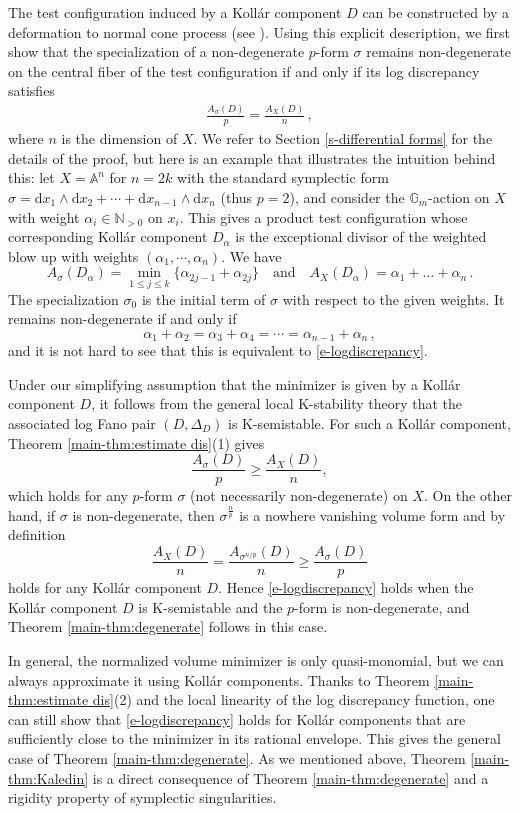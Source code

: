 \documentclass[12pt]{amsart}
\theoremstyle{definition}
\newcommand{\bN}{\mathbb{N}}
\newcommand{\bG}{\mathbb{G}}
\newcommand{\rd}{\mathrm{d}}
\numberwithin{equation}{section}
\begin{document}
The test configuration induced by a Koll\'ar component $D$ can be constructed by a deformation to normal cone process (see \cite{LX-Kol-comp-stab}). Using this explicit description, we first show that the specialization of a non-degenerate $p$-form $\sigma$ remains non-degenerate on the central fiber of the test configuration if and only if its log discrepancy satisfies 
\begin{eqnarray}\label{e-logdiscrepancy}
\frac{A_{\sigma}(D)}{p}=\frac{A_{X}(D)}{n} \, ,
\end{eqnarray}
where $n$ is the dimension of $X$. We refer to Section \ref{s-differential forms} for the details of the proof, but here is an example that illustrates the intuition behind this: let $X=\mathbb A^n$ for $n=2k$ with the standard symplectic form $\sigma = \rd x_1 \wedge \rd x_2+\cdots+ \rd x_{n-1}\wedge \rd x_{n}$ (thus $p=2$), and consider the $\bG_m$-action on $X$ with weight $\alpha_i\in \bN_{>0}$ on $x_i$. This gives a product test configuration whose corresponding Koll\'ar component $D_{\alpha}$ is the exceptional divisor of the weighted blow up with weights $(\alpha_1,\cdots,\alpha_{n})$. We have 
\[
A_{\sigma}(D_\alpha)=\min_{1\le j \le k}\{\alpha_{2j-1}+\alpha_{2j}\} \quad \mathrm{and}\quad A_X(D_\alpha) = \alpha_1+\dots+\alpha_n\,.
\]
The specialization $\sigma_0$ is the initial term of $\sigma$ with respect to the given weights. It remains non-degenerate if and only if
\[
\alpha_1+\alpha_2=\alpha_3+\alpha_4=\cdots=\alpha_{n-1}+\alpha_n \, ,
\]
and it is not hard to see that this is equivalent to \eqref{e-logdiscrepancy}.

Under our simplifying assumption that the minimizer is given by a Koll\'ar component $D$, it follows from the general local K-stability theory \cite{LX-Kol-comp-stab} that the associated log Fano pair $(D,\Delta_D)$ is K-semistable. For such a Koll\'ar component, Theorem \ref{main-thm:estimate dis}(1) gives 
\[
\frac{A_{\sigma}(D)}{p}\ge \frac{A_{X}(D)}{n},
\]
which holds for any $p$-form $\sigma$ (not necessarily non-degenerate) on $X$. On the other hand, if $\sigma$ is non-degenerate, then $\sigma^{\frac{n}{p}}$ is a nowhere vanishing volume form and by definition 
\[
\frac{A_X(D)}{n} = \frac{A_{\sigma^{n/p}}(D)}{n}\ge \frac{A_{\sigma}(D)}{p}
\]
holds for any Koll\'ar component $D$. Hence \eqref{e-logdiscrepancy} holds when the Koll\'ar component $D$ is K-semistable and the $p$-form is non-degenerate, and Theorem \ref{main-thm:degenerate} follows in this case. 

In general, the normalized volume minimizer is only quasi-monomial, but we can always approximate it using Koll\'ar components. Thanks to Theorem \ref{main-thm:estimate dis}(2) and the local linearity of the log discrepancy function, one can still show that \eqref{e-logdiscrepancy} holds for Koll\'ar components that are sufficiently close to the minimizer in its rational envelope. This gives the general case of Theorem \ref{main-thm:degenerate}. As we mentioned above, Theorem \ref{main-thm:Kaledin} is a direct consequence of Theorem \ref{main-thm:degenerate} and a rigidity property of symplectic singularities.
\end{document}
